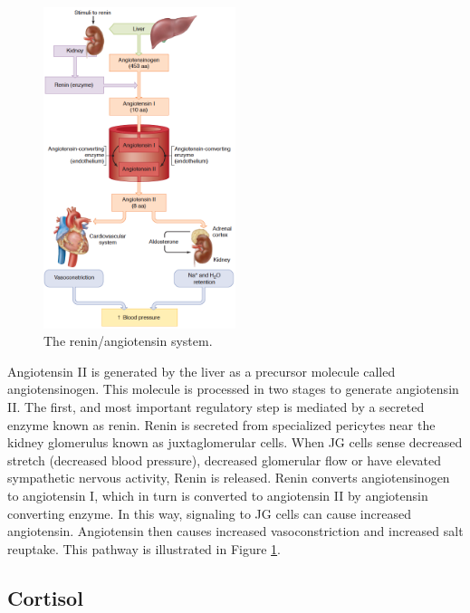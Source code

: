 \documentclass{tufte-handout}
\begin{document}
\begin{figure}
\centering
  \includegraphics[width=0.5\textwidth]{figures/renin-angiotensin}
  \caption{The renin/angiotensin system.}
    \label{fig:renin-angiotensin}
\end{figure}

 Angiotensin II is generated by the liver as a precursor molecule called angiotensinogen.  This molecule is processed in two stages to generate angiotensin II.  The first, and most important regulatory step is mediated by a secreted enzyme known as renin.  Renin is secreted from specialized pericytes near the kidney glomerulus known as juxtaglomerular cells.  When JG cells sense decreased stretch (decreased blood pressure), decreased glomerular flow or have elevated sympathetic nervous activity, Renin is released.  Renin converts angiotensinogen to angiotensin I, which in turn is converted to angiotensin II by angiotensin converting enzyme.  In this way, signaling to JG cells can cause increased angiotensin.  Angiotensin then causes increased vasoconstriction and increased salt reuptake.  This pathway is illustrated in Figure \ref{fig:renin-angiotensin}.

\subsection{Cortisol}
\end{document}
